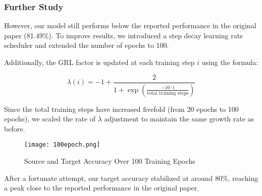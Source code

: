 \documentclass{rapportECL}
\begin{document}
\subsubsection*{Further Study}
However, our model still performs below the reported performance in the original paper (81.49\%). To improve results, we introduced a step decay learning rate scheduler and extended the number of epochs to 100.

Additionally, the GRL factor is updated at each training step $i$ using the formula:

\[
\lambda \left(i\right) = -1 + \frac{2}{1 + \exp \left( \frac{-10 \cdot \text{i}}{\text{total training steps}} \right)}
\]

Since the total training steps have increased fivefold (from 20 epochs to 100 epochs), we scaled the rate of $\lambda$ adjustment to maintain the same growth rate as before.
\begin{figure}[H]
    \centering
    \texttt{[image: 100epoch.png]}
    \caption{Source and Target Accuracy Over 100 Training Epochs}
\end{figure}

After a fortunate attempt, our target accuracy stabilized at around 80\%, reaching a peak close to the reported performance in the original paper.
\end{document}
